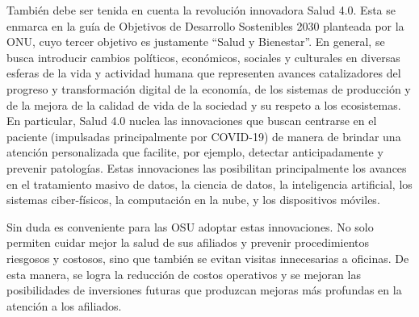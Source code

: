 También debe ser tenida en cuenta la revolución innovadora Salud 4.0. Esta se enmarca en la guía de Objetivos de Desarrollo Sostenibles 2030 planteada por la ONU, cuyo tercer objetivo es justamente “Salud y Bienestar”. En general, se busca introducir cambios políticos, económicos, sociales y culturales en diversas esferas de la vida y actividad humana que representen avances catalizadores del progreso y transformación digital de la economía, de los sistemas de producción y de la mejora de la calidad de vida de la sociedad y su respeto a los ecosistemas. En particular, Salud 4.0 nuclea las innovaciones que buscan centrarse en el paciente (impulsadas principalmente por COVID-19) de manera de brindar una atención personalizada que facilite, por ejemplo, detectar anticipadamente y prevenir patologías. Estas innovaciones las posibilitan principalmente los avances en el tratamiento masivo de datos, la ciencia de datos, la inteligencia artificial, los sistemas ciber-físicos, la computación en la nube, y los dispositivos móviles. 

Sin duda es conveniente para las OSU adoptar estas innovaciones. No solo permiten cuidar mejor la salud de sus afiliados y prevenir procedimientos riesgosos y costosos, sino que también se evitan visitas innecesarias a oficinas. De esta manera, se logra la reducción de  costos operativos y se mejoran las posibilidades de inversiones futuras que produzcan  mejoras más profundas en la atención a los afiliados.


